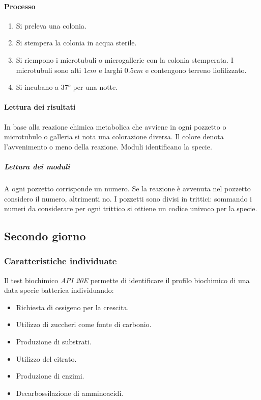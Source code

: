 			\paragraph{Processo}
			\begin{multicols}{2}
				\begin{enumerate}
					\item Si preleva una colonia.
					\item Si stempera la colonia in acqua sterile.
					\item Si riempono i microtubuli o microgallerie con la colonia stemperata.
						I microtubuli sono alti $1\si{cm}$ e larghi $0.5\si{cm}$ e contengono terreno liofilizzato.
					\item Si incubano a $37\si{\degree}$ per una notte.
				\end{enumerate}
			\end{multicols}

			\paragraph{Lettura dei risultati}
			In base alla reazione chimica metabolica che avviene in ogni pozzetto o microtubulo o galleria si nota una colorazione diversa.
			Il colore denota l'avvenimento o meno della reazione.
			Moduli identificano la specie.

				\subparagraph{Lettura dei moduli}
				A ogni pozzetto corrisponde un numero.
				Se la reazione \`e avvenuta nel pozzetto considero il numero, altrimenti no.
				I pozzetti sono divisi in trittici: sommando i numeri da considerare per ogni trittico si ottiene un codice univoco per la specie.
	\subsection{Secondo giorno}
	
		\subsubsection{Caratteristiche individuate}
		Il test biochimico \emph{API 20E} permette di identificare il profilo biochimico di una data specie batterica individuando:
		\begin{multicols}{3}
			\begin{itemize}
				\item Richiesta di ossigeno per la crescita.
				\item Utilizzo di zuccheri come fonte di carbonio.
				\item Produzione di substrati.
				\item Utilizzo del citrato.
				\item Produzione di enzimi.
				\item Decarbossilazione di amminoacidi.
			\end{itemize}
		\end{multicols}

